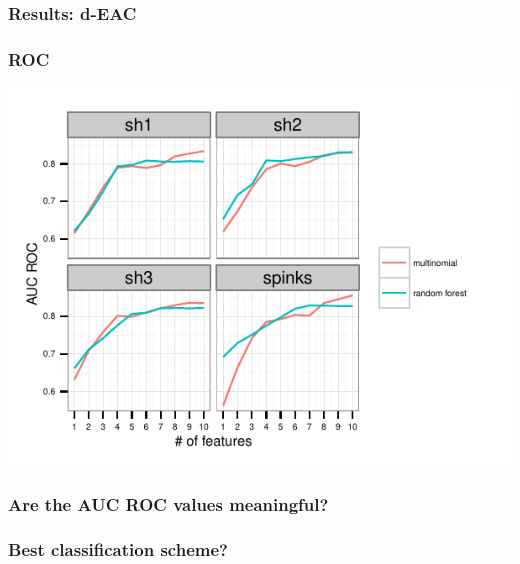 \documentclass{beamer}\usepackage{graphicx, color}
\makeatletter
\def\maxwidth{ %
  \ifdim\Gin@nat@width>\linewidth
    \linewidth
  \else
    \Gin@nat@width
  \fi
}
\newenvironment{knitrout}{}{} %
\makeatother
\begin{document}
\begin{frame}
  \frametitle{Results: d-EAC}

\end{frame}

\begin{frame}[fragile]
  \frametitle{ROC}
\begin{knitrout}
\color{fgcolor}
\includegraphics[width=\maxwidth]{figure/roc} 

\end{knitrout}


\end{frame}

\begin{frame}
  \frametitle{Are the AUC ROC values meaningful?}
\end{frame}


\begin{frame}
  \frametitle{Best classification scheme?}
\end{frame}
\end{document}
